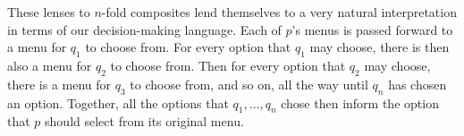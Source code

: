 \documentclass[Book-Poly]{subfiles}
\begin{document}

These lenses to $n$-fold composites lend themselves to a very natural interpretation in terms of our decision-making language.
Each of $p$'s menus is passed forward to a menu for $q_1$ to choose from.
For every option that $q_1$ may choose, there is then also a menu for $q_2$ to choose from.
Then for every option that $q_2$ may choose, there is a menu for $q_3$ to choose from, and so on, all the way until $q_n$ has chosen an option.
Together, all the options that $q_1,\ldots,q_n$ chose then inform the option that $p$ should select from its original menu.

\end{document}
